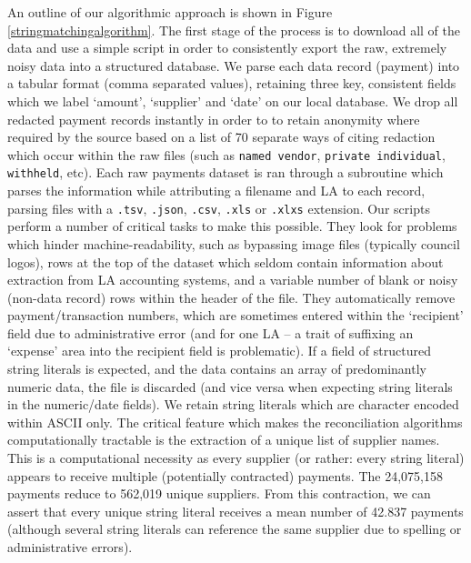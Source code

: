 \documentclass[12pt]{article}
\begin{document}
An outline of our algorithmic approach is shown in Figure \ref{stringmatchingalgorithm}. The first stage of the process is to download all of the data and use a simple script in order to consistently export the raw, extremely noisy data into a structured database. We parse each data record (payment) into a tabular format (comma separated values), retaining three key, consistent fields which we label `amount', `supplier' and `date' on our local database. We drop all redacted payment records instantly in order to to retain anonymity where required by the source based on a list of 70 separate ways of citing redaction which occur within the raw files (such as \texttt{named vendor}, \texttt{private individual}, \texttt{withheld}, etc). Each raw payments dataset is ran through a subroutine which parses the information while attributing a filename and LA to each record, parsing files with a \texttt{.tsv}, \texttt{.json}, \texttt{.csv}, \texttt{.xls} or \texttt{.xlxs} extension. Our scripts perform a number of critical tasks to make this possible. They look for problems which hinder machine-readability, such as bypassing image files (typically council logos), rows at the top of the dataset which seldom contain information about extraction from LA accounting systems, and a variable number of blank or noisy (non-data record) rows within the header of the file. They automatically remove payment/transaction numbers, which are sometimes entered within the `recipient' field due to administrative error (and for one LA -- a trait of suffixing an `expense' area into the recipient field is problematic). If a field of structured string literals is expected, and the data contains an array of predominantly numeric data, the file is discarded (and vice versa when expecting string literals in the numeric/date fields). We retain string literals which are character encoded within ASCII only. The critical feature which makes the reconciliation algorithms computationally tractable is the extraction of a unique list of supplier names. This is a computational necessity as every supplier (or rather: every string literal) appears to receive multiple (potentially contracted) payments. The 24,075,158 payments reduce to 562,019 unique suppliers. From this contraction, we can assert that every unique string literal receives a mean number of 42.837 payments (although several string literals can reference the same supplier due to spelling or administrative errors).
\end{document}
